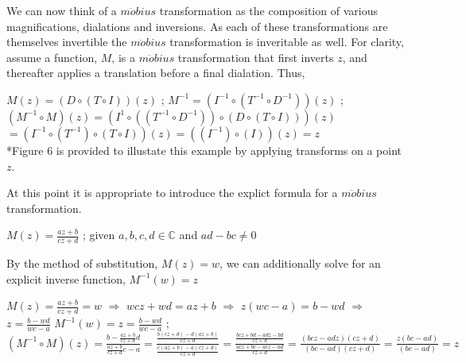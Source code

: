 \documentclass[a4paper,man,natbib]{apa6}
\newcommand{\C}{\mathbb{C}}  %
\begin{document}
We can now think of a $ m\ddot{o}bius $ transformation as the composition of various magnifications, dialations and inversions. 
As each of these transformations are themselves invertible the $ m\ddot{o}bius $ transformation is inveritable as well. For clarity, assume a function, $ M $,
is a $ m\ddot{o}bius $ transformation that first inverts $ z $, and thereafter applies a translation before a final dialation. Thus,

\begin{center}

      $ M(z) = (D \circ (T \circ I))(z) $ ; $ M^{-1} = (I^{-1} \circ (T^{-1} \circ D^{-1}))(z) $ ; \\
      $ (M^{-1} \circ M)(z) = (I^{1} \circ ((T^{-1} \circ D^{-1})) \circ (D \circ (T \circ I)))(z) $ \\ 
      $ = (I^{-1} \circ (T^{-1}) \circ (T \circ I))(z) = ((I^{-1}) \circ (I))(z) = z $ \\
      *Figure 6 is provided to illustate this example by applying transforms on a point $ z $.

\end{center}

At this point it is appropriate to introduce the explict formula for a $ m\ddot{o}bius $ transformation.

\begin{center}

      $ M(z) = \frac{az + b}{cz + d} $ ; given $ a,b,c,d \in \C $ and $ ad - bc \neq 0 $

\end{center}

By the method of substitution, $ M(z) = w $, we can additionally solve for an explicit inverse function, $ M^{-1}(w) = z $

\begin{center}

      $ M(z) = \frac{az + b}{cz + d} = w $ $ \Rightarrow $ $ wcz + wd = az + b $ $ \Rightarrow $ $ z(wc - a) = b - wd $ $ \Rightarrow $ $ z = \frac{b - wd}{wc - a} $
      $ M^{-1}(w) = z = \frac{b - wd}{wc - a} $ ; $ (M^{-1} \circ M)(z) = \frac{b - \frac{az + b}{cz + d}d}{\frac{az + b}{cz + d}c - a} 
      = \frac{\frac{b(cz + d) - d(az + b)}{cz + d}}{\frac{c(az + b) - a(cz + d)}{cz + d}} = \frac{\frac{bcz + bd - adz - bd}{cz + d}}{\frac{acz + bc - acz - ad}{cz + d}} 
      = \frac{(bcz - adz)(cz +d)}{(bc - ad)(cz + d)} = \frac{z(bc - ad)}{(bc - ad)} = z $ 

\end{center}
\end{document}

